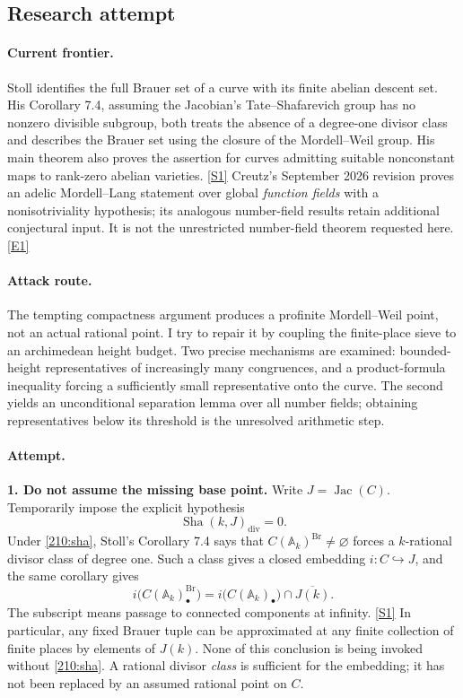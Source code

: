 \documentclass[11pt,a4paper]{article}
\newcommand{\A}{\mathbb{A}}
\newcommand{\sref}[2]{\hyperlink{source:#1:#2}{[S#2]}}
\newcommand{\eref}[2]{\hyperlink{extra:#1:#2}{[E#2]}}
\begin{document}
\subsection{Research attempt}

\paragraph{Current frontier.}
Stoll identifies the full Brauer set of a curve with its finite abelian
descent set. His Corollary 7.4, assuming the Jacobian's Tate--Shafarevich
group has no nonzero divisible subgroup, both treats the absence of a
degree-one divisor class and describes the Brauer set using the closure
of the Mordell--Weil group. His main theorem also proves the assertion for
curves admitting suitable nonconstant maps to rank-zero abelian varieties.
\sref{210}{1} Creutz's September 2026 revision proves an adelic
Mordell--Lang statement over global \emph{function fields} with a
nonisotriviality hypothesis; its analogous number-field results retain
additional conjectural input. It is not the unrestricted number-field
theorem requested here.\eref{210}{1}

\paragraph{Attack route.}
The tempting compactness argument produces a profinite Mordell--Weil point,
not an actual rational point. I try to repair it by coupling the finite-place
sieve to an archimedean height budget. Two precise mechanisms are examined:
bounded-height representatives of increasingly many congruences, and a
product-formula inequality forcing a sufficiently small representative
onto the curve. The second yields an unconditional separation lemma over
all number fields; obtaining representatives below its threshold is the
unresolved arithmetic step.

\paragraph{Attempt.}
\textbf{1. Do not assume the missing base point.}
Write $J=\operatorname{Jac}(C)$. Temporarily impose the explicit hypothesis
\begin{equation}\label{210:sha}
 \operatorname{Sha}(k,J)_{\mathrm{div}}=0.
\end{equation}
Under \eqref{210:sha}, Stoll's Corollary 7.4 says that
$C(\A_k)^{\operatorname{Br}}\ne\varnothing$ forces a $k$-rational divisor
class of degree one. Such a class gives a closed embedding $i:C\hookrightarrow J$,
and the same corollary gives
\[
 i\bigl(C(\A_k)^{\operatorname{Br}}_\bullet\bigr)
 =i\bigl(C(\A_k)_\bullet\bigr)\cap\overline{J(k)}.
\]
The subscript means passage to connected components at infinity.
\sref{210}{1} In particular, any fixed Brauer tuple can be approximated
at any finite collection of finite places by elements of $J(k)$.
None of this conclusion is being invoked without \eqref{210:sha}.
A rational divisor \emph{class} is sufficient for the embedding; it has
not been replaced by an assumed rational point on $C$.
\end{document}
